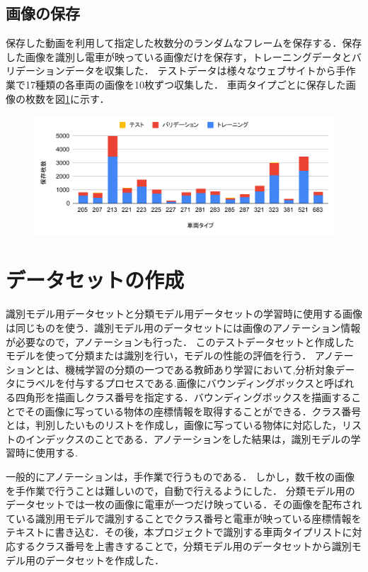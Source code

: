 \subsection{画像の保存}
保存した動画を利用して指定した枚数分のランダムなフレームを保存する．保存した画像を識別し電車が映っている画像だけを保存す，トレーニングデータとバリデーションデータを収集した．
テストデータは様々なウェブサイトから手作業で17種類の各車両の画像を10枚ずつ収集した．
車両タイプごとに保存した画像の枚数を図\ref{fig:chart}に示す．


\begin{figure}[H]
	\centering
	\includegraphics[width=\linewidth]{chap3/fig/chart2}
	\caption[各車両タイプ（全17種）の保存枚数]{}
	\label{fig:chart}
\end{figure}



\section{データセットの作成}

識別モデル用データセットと分類モデル用データセットの学習時に使用する画像は同じものを使う．識別モデル用のデータセットには画像のアノテーション情報が必要なので，アノテーションも行った．
このテストデータセットと作成したモデルを使って分類または識別を行い，モデルの性能の評価を行う．
アノテーションとは、機械学習の分類の一つである教師あり学習において,分析対象データにラベルを付与するプロセスである.画像にバウンディングボックスと呼ばれる四角形を描画しクラス番号を指定する．バウンディングボックスを描画することでその画像に写っている物体の座標情報を取得することができる．クラス番号とは，判別したいものリストを作成し，画像に写っている物体に対応した，リストのインデックスのことである．アノテーションをした結果は，識別モデルの学習時に使用する.

一般的にアノテーションは，手作業で行うものである．
しかし，数千枚の画像を手作業で行うことは難しいので，自動で行えるようにした．
分類モデル用のデータセットでは一枚の画像に電車が一つだけ映っている．その画像を配布されている識別用モデルで識別することでクラス番号と電車が映っている座標情報をテキストに書き込む．その後，本プロジェクトで識別する車両タイプリストに対応するクラス番号を上書きすることで，分類モデル用のデータセットから識別モデル用のデータセットを作成した．

